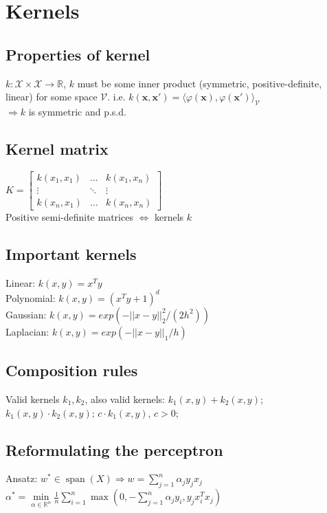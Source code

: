 \section*{Kernels}

\subsection*{Properties of kernel}
$k: \mathcal{X} \times \mathcal{X} \rightarrow \mathbb{R}$, $k$ must be some inner product (symmetric, positive-definite, linear) for some space $\mathcal{V}$.
i.e. $k(\mathbf{x}, \mathbf{x'}) = \langle \varphi(\mathbf{x}), \varphi(\mathbf{x'}) \rangle_\mathcal{V}$\\
$\Rightarrow k$ is symmetric and p.s.d. 

\subsection*{Kernel matrix}
$K = 
\begin{bmatrix}
	k(x_1,x_1) & \dots & k(x_1,x_n) \\
	\vdots & \ddots & \vdots \\
	k(x_n, x_1) & \dots & k(x_n,x_n)
\end{bmatrix}$\\
Positive semi-definite matrices $\Leftrightarrow$ kernels $k$

\subsection*{Important kernels}
Linear: $k(x,y)=x^T y$\\
Polynomial: $k(x,y)=(x^T y + 1)^d$\\
Gaussian: $k(x,y) = exp(-||x-y||_2^2/(2h^2))$\\
Laplacian: $k(x,y) = exp(-||x-y||_1/h)$

\subsection*{Composition rules}
Valid kernels $k_1, k_2$, also valid kernels:
$k_1(x,y) + k_2(x,y)$; $k_1(x,y) \cdot k_2(x,y)$; $c \cdot k_1(x,y)$, $c>0$;

\subsection*{Reformulating the perceptron}

Ansatz: $w^* \in \operatorname{span}(X) \Rightarrow w = \sum_{j=1}^n \alpha_j y_j x_j$\\
$\alpha^*= \underset{\alpha \in \mathbb{R}^n}{\operatorname{min}} \frac{1}{n} \sum_{i=1}^n \operatorname{max}(0, - \sum_{j=1}^n \alpha_j y_i,y_j x_i^T x_j)$

